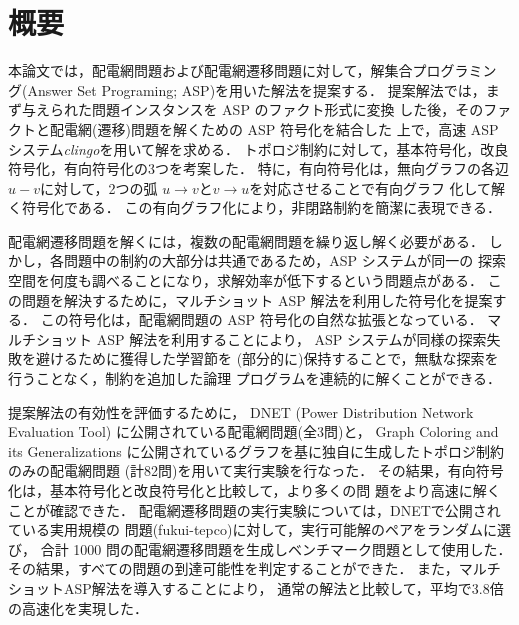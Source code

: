 \chapter*{概要}

本論文では，配電網問題および配電網遷移問題に対して，解集合プログラミン
グ(Answer Set Programing; ASP)を用いた解法を提案する．
提案解法では，まず与えられた問題インスタンスを ASP のファクト形式に変換
した後，そのファクトと配電網(遷移)問題を解くための ASP 符号化を結合した
上で，高速 ASP システム\textit{clingo}を用いて解を求める．
トポロジ制約に対して，基本符号化，改良符号化，有向符号化の3つを考案した．
特に，有向符号化は，無向グラフの各辺$u-v$に対して，2つの弧
$u\rightarrow v$と$v\rightarrow u$を対応させることで有向グラフ
化して解く符号化である．
この有向グラフ化により，非閉路制約を簡潔に表現できる．

配電網遷移問題を解くには，複数の配電網問題を繰り返し解く必要がある．
しかし，各問題中の制約の大部分は共通であるため，ASP システムが同一の
探索空間を何度も調べることになり，求解効率が低下するという問題点がある．
この問題を解決するために，マルチショット ASP 解法を利用した符号化を提案する．
この符号化は，配電網問題の ASP 符号化の自然な拡張となっている．
マルチショット ASP 解法を利用することにより，
ASP システムが同様の探索失敗を避けるために獲得した学習節を
(部分的に)保持することで，無駄な探索を行うことなく，制約を追加した論理
プログラムを連続的に解くことができる．

提案解法の有効性を評価するために，
DNET (Power Distribution Network Evaluation Tool)
に公開されている配電網問題(全3問)と，
Graph Coloring and its Generalizations
に公開されているグラフを基に独自に生成したトポロジ制約のみの配電網問題
(計82問)を用いて実行実験を行なった．
その結果，有向符号化は，基本符号化と改良符号化と比較して，より多くの問
題をより高速に解くことが確認できた．
%
配電網遷移問題の実行実験については，DNETで公開されている実用規模の
問題({\sf fukui-tepco})に対して，実行可能解のペアをランダムに選び，
合計 1000 問の配電網遷移問題を生成しベンチマーク問題として使用した．
その結果，すべての問題の到達可能性を判定することができた．
また，マルチショットASP解法を導入することにより，
通常の解法と比較して，平均で3.8倍の高速化を実現した．



